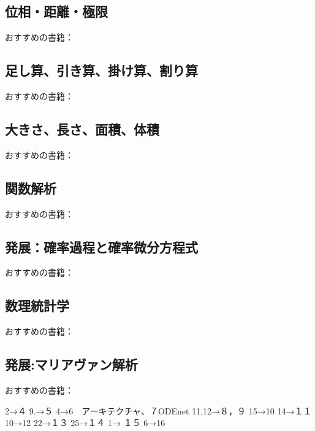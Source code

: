 \documentclass{jsarticle}
\begin{document}
\subsection{位相・距離・極限}
おすすめの書籍：



\subsection{足し算、引き算、掛け算、割り算}
おすすめの書籍：



\subsection{大きさ、長さ、面積、体積}
おすすめの書籍：


\subsection{関数解析}
おすすめの書籍：

\subsection{発展：確率過程と確率微分方程式}
おすすめの書籍：

\subsection{数理統計学}
おすすめの書籍：





\subsection{発展:マリアヴァン解析}
おすすめの書籍：



2→４
9.→５
4→6　アーキテクチャ、７ODEnet
11,12→８，９
15→10
14→１１
10→12
22→１３
25→１４
1→  １５
6→16
\newpage
\end{document}
